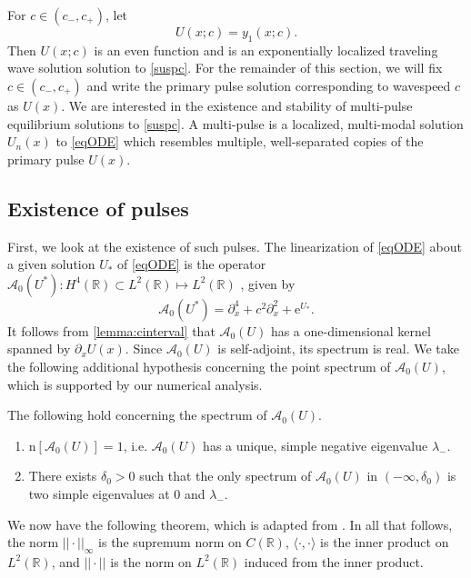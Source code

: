 \documentclass[review,onefignum,onetabnum]{siamart171218}
\newcommand{\R}{\mathbb{R}}
\newcommand{\rme}{\mathrm{e}}
\newcommand{\rmn}{\mathrm{n}}
\newcommand{\calA}{\mathcal{A}}
\begin{document}
For $c \in (c_-, c_+)$, let
\begin{equation}\label{suspU}
U(x; c) = y_1(x; c).
\end{equation}
Then $U(x; c)$ is an even function and is an exponentially localized traveling wave solution solution to \cref{suspc}. For the remainder of this section, we will fix $c \in (c_-, c_+)$ and write the primary pulse solution corresponding to wavespeed $c$ as $U(x)$. We are interested in the existence and stability of multi-pulse equilibrium solutions to \cref{suspc}. A multi-pulse is a localized, multi-modal solution $U_n(x)$ to \cref{eqODE} which resembles multiple, well-separated copies of the primary pulse $U(x)$.

\subsection{Existence of pulses}

First, we look at the existence of such pulses. The linearization of \cref{eqODE} about a given solution $U_*$ of \cref{eqODE} is the operator 
$\calA_0(U^*): H^4(\R) \subset L^2(\R) \mapsto L^2(\R)$
, given by
\begin{equation}\label{defA0}
\calA_0(U^*) = \partial_x^4 + c^2 \partial_x^2 + \rme^{U_*}.
\end{equation}
It follows from \cref{lemma:cinterval} that $\calA_0(U)$ has a one-dimensional kernel spanned by $\partial_x U(x)$. Since $\calA_0(U)$ is self-adjoint, its spectrum is real. We take the following additional hypothesis concerning the point spectrum of $\calA_0(U)$, which is supported by our numerical analysis.

\begin{hypothesis}\label{A0hyp}
The following hold concerning the spectrum of $\calA_0(U)$.
\begin{enumerate}
\item $\rmn[\calA_0(U)]=1$, i.e. $\calA_0(U)$ has a unique, simple negative eigenvalue $\lambda_-$.
\item There exists $\delta_0 > 0$ such that the only spectrum of $\calA_0(U)$ in $(-\infty, \delta_0)$ is two simple eigenvalues at $0$ and $\lambda_-$.
\end{enumerate}
\end{hypothesis}

We now have the following theorem, which is adapted from \cite[Theorem~3.6]{sandstede:iol97}.
In all that follows, the norm $||\cdot||_\infty$ is the supremum norm on $C(\R)$, $\langle \cdot, \cdot \rangle$ is the inner product on $L^2(\R)$, and $|| \cdot ||$ is the norm on $L^2(\R)$ induced from the inner product.
\end{document}
